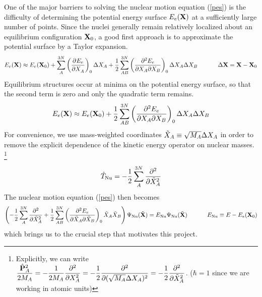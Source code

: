 \documentclass[11pt]{article}
\begin{document}
One of the major barriers to solving the nuclear motion equation (\ref{pes}) is
the difficulty of determining the potential energy surface $E_e(\mathbf{X})$ at a
sufficiently large number of points. Since the nuclei generally remain
relatively localized about an equilibrium configuration $\mathbf{X}_0$, a good
first approach is to approximate the potential surface by a Taylor expansion.
\begin{align*}
    E_e(\mathbf{X})
\approx
    E_e(\mathbf{X}_0)
+\sum_A^{3N}
    \left( \dfrac{ \partial^{} E_e }{\partial X_A ^{}}\right)_0
    \Delta X_A
+\dfrac{1}{2}\sum_{AB}^{3N}
    \left(\dfrac{\partial^2E_e}{\partial X_A\partial X_B}\right)_0
    \Delta X_A
    \Delta X_B
    \ \ \ \ \ \ \ \ \ \  \Delta\mathbf{X}=\mathbf{X}-\mathbf{X}_0
\end{align*}
Equilibrium structures occur at minima on the potential energy surface, so that
the second term is zero and only the quadratic term remains.
\begin{align}
    E_e(\mathbf{X})
\approx
    E_e(\mathbf{X}_0)
+\dfrac{1}{2}\sum_{AB}^{3N}
    \left(\dfrac{\partial^2E_e}{\partial X_A\partial X_B}\right)_0
    \Delta X_A
    \Delta X_B
\end{align}
For convenience, we use mass-weighted coordinates $\tilde{X}_A \equiv \sqrt{M_A}\Delta
X_A$ in order to remove the explicit dependence of the kinetic energy operator
on nuclear masses. \footnote{Explicitly, we can write
$\dfrac{\hat{\mathbf{P}}_A^2}{2M_A} = -\dfrac{1}{2M_A}
 \dfrac{ \partial^{2}  }{\partial X_A ^{2}}=-\dfrac{1}{2} \dfrac{ \partial^{2}  }{\partial (\sqrt{M_A}\Delta
X_A) ^{2}}=-\dfrac{1}{2} \dfrac{ \partial^{2}  }{\partial \tilde{X}_A ^{2}}$. ($\hbar=1$ since we are working in atomic
units)}
\begin{align}
    \hat{T}_{\mathrm{Nu}}
=
    -\dfrac{1}{2}\sum_A^{3N}  \dfrac{ \partial^{2}  }{\partial \tilde{X}_A ^{2}}
\end{align}
The nuclear motion equation (\ref{pes}) then becomes
\begin{align}
\label{pes-intermediate}
\left(
-\dfrac{1}{2}\sum_A^{3N}
     \dfrac{ \partial^{2}  }{\partial \tilde{X}_A ^{2}}
+\dfrac{1}{2}\sum_{AB}^{3N}
    \left(\dfrac{\partial^2E_e}{\partial \tilde{X}_A\partial \tilde{X}_B}\right)_0
    \tilde{X}_A
    \tilde{X}_B
\right)
    \Psi_{\mathrm{Nu}}(\tilde{\mathbf{X}})
=
    E_{\mathrm{Nu}}
    \Psi_{\mathrm{Nu}}(\tilde{\mathbf{X}})
\ \ \ \ \ \ \ \ \ \ 
    E_{\mathrm{Nu}}
\equiv
    E - E_e(\mathbf{X}_0)
\end{align}
which brings us to the crucial step that motivates this project.
\end{document}
